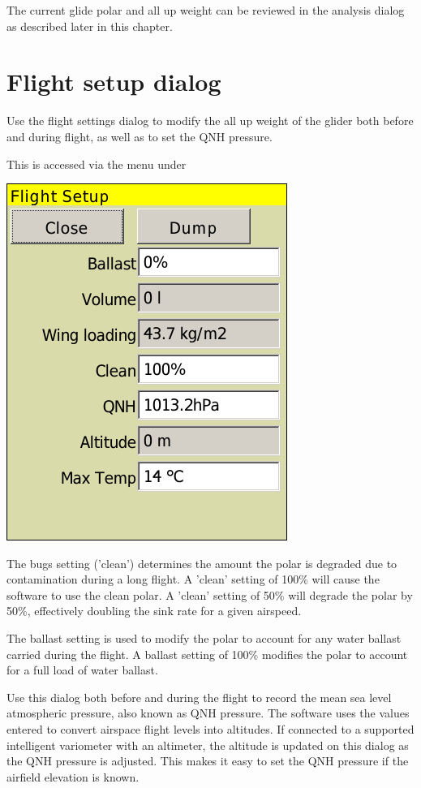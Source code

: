
The current glide polar and all up weight can be reviewed in the
analysis dialog as described later in this chapter.

\section{Flight setup dialog}\label{sec:basic-sett-dial}
Use the flight settings dialog to modify the all up weight of the glider both
before and during flight, as well as to set the QNH pressure.  

This is accessed via the menu under 
\begin{quote}
\blink{}
\end{quote}

\begin{center}
\includegraphics[angle=0,width=0.45\linewidth,keepaspectratio='true']{figures/dialog-basicsettings.png}
\end{center}

The bugs setting ('clean') determines the amount the polar is degraded
due to contamination during a long flight.  A 'clean' setting of 100\%
will cause the software to use the clean polar. A 'clean' setting of
50\% will degrade the polar by 50\%, effectively doubling the sink
rate for a given airspeed.

The ballast setting is used to modify the polar to account for any
water ballast carried during the flight. A ballast setting of 100\%
modifies the polar to account for a full load of water ballast.  

Use this dialog both before and during the flight to record the mean
sea level atmospheric pressure, also known as QNH pressure.  The
software uses the values entered to convert airspace flight levels
into altitudes.  If connected to a supported intelligent variometer
with an altimeter, the altitude is updated on this dialog as the QNH
pressure is adjusted.  This makes it easy to set the QNH pressure if
the airfield elevation is known.

